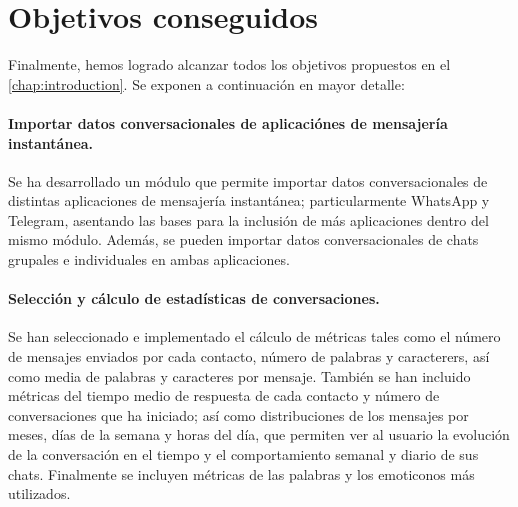 \begin{comment}
The relevant idea behind the estimator developed in Section \ref{reamining_time_at_anytime} is that it can be understood as a system that corrects the estimations provided by another system. This could be an easy to implement solution for improving the accuracy of the estimations made by more complex systems just by setting it prior to them.

The main limitation for implementing the proposed online estimator is the bottleneck produced by the \acrshort{crtm} \acrshort{api} server, which would not be able to handle all the needed requests for sampling all the bus stops at the same time. Nevertheless, the computational cost of each of the used models was calculated in case that the processing capacity requirements were to be consider for a future implementation.

In general, the developed methods in this Project are built in a way that allows the usability for other similar use cases. The hyperparameters of the estimators are chosen based on the data and the available input features, so they can be easily adapted for different system behaviors.
\end{comment}

\section{Objetivos conseguidos}
\label{sec:achieved-goals}

Finalmente, hemos logrado alcanzar todos los objetivos propuestos en el \autoref{chap:introduction}. Se exponen a continuación en mayor detalle:

\paragraph{Importar datos conversacionales de aplicaciónes de mensajería instantánea.} Se ha desarrollado un módulo que permite importar datos conversacionales de distintas aplicaciones de mensajería instantánea; particularmente WhatsApp y Telegram, asentando las bases para la inclusión de más aplicaciones dentro del mismo módulo. Además, se pueden importar datos conversacionales de chats grupales e individuales en ambas aplicaciones.

\paragraph{Selección y cálculo de estadísticas de conversaciones.} Se han seleccionado e implementado el cálculo de métricas tales como el número de mensajes enviados por cada contacto, número de palabras y caracterers, así como media de palabras y caracteres por mensaje. También se han incluido métricas del tiempo medio de respuesta de cada contacto y número de conversaciones que ha iniciado; así como distribuciones de los mensajes por meses, días de la semana y horas del día, que permiten ver al usuario la evolución de la conversación en el tiempo y el comportamiento semanal y diario de sus chats. Finalmente se incluyen métricas de las palabras y los emoticonos más utilizados.

